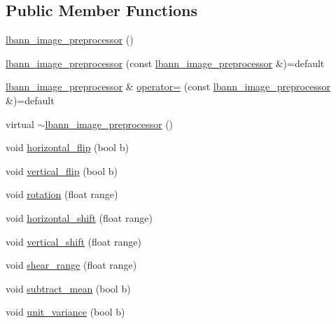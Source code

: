 \subsection*{Public Member Functions}
\begin{DoxyCompactItemize}
\item 
\hyperlink{classlbann_1_1lbann__image__preprocessor_a6a0f92194d42e87d73b57ba0929e2b2d}{lbann\+\_\+image\+\_\+preprocessor} ()
\item 
\hyperlink{classlbann_1_1lbann__image__preprocessor_aeeca5696dbfde9ccb1112cbd8524940b}{lbann\+\_\+image\+\_\+preprocessor} (const \hyperlink{classlbann_1_1lbann__image__preprocessor}{lbann\+\_\+image\+\_\+preprocessor} \&)=default
\item 
\hyperlink{classlbann_1_1lbann__image__preprocessor}{lbann\+\_\+image\+\_\+preprocessor} \& \hyperlink{classlbann_1_1lbann__image__preprocessor_af652494123a62e653cd7dc2d7c340219}{operator=} (const \hyperlink{classlbann_1_1lbann__image__preprocessor}{lbann\+\_\+image\+\_\+preprocessor} \&)=default
\item 
virtual \hyperlink{classlbann_1_1lbann__image__preprocessor_aaabfad8d6923680cf4943f6f5290c682}{$\sim$lbann\+\_\+image\+\_\+preprocessor} ()
\item 
void \hyperlink{classlbann_1_1lbann__image__preprocessor_a4ba2de0a781dfa0a2652ad4d777a241f}{horizontal\+\_\+flip} (bool b)
\item 
void \hyperlink{classlbann_1_1lbann__image__preprocessor_aeb7d75e4d3361ae2836afabc14510d74}{vertical\+\_\+flip} (bool b)
\item 
void \hyperlink{classlbann_1_1lbann__image__preprocessor_a1a293733368dd9eceba3e99cf9e5ae24}{rotation} (float range)
\item 
void \hyperlink{classlbann_1_1lbann__image__preprocessor_ae62596b4af5d1940aa0499cde2bdd005}{horizontal\+\_\+shift} (float range)
\item 
void \hyperlink{classlbann_1_1lbann__image__preprocessor_a50ac63e1f6b1b9806cbf6c06f53f4aca}{vertical\+\_\+shift} (float range)
\item 
void \hyperlink{classlbann_1_1lbann__image__preprocessor_aef1e2375fd518e69df800b0dcbcb37d0}{shear\+\_\+range} (float range)
\item 
void \hyperlink{classlbann_1_1lbann__image__preprocessor_afa470b696ba435c20050187a0232717d}{subtract\+\_\+mean} (bool b)
\item 
void \hyperlink{classlbann_1_1lbann__image__preprocessor_a05c4cb5cb842df5d46eebe15c6ea9de3}{unit\+\_\+variance} (bool b)

\end{DoxyCompactItemize}
